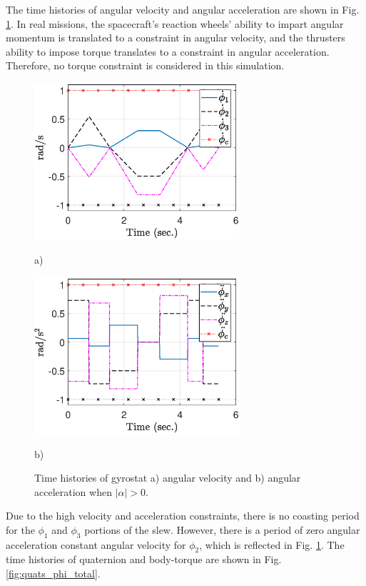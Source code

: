 \documentclass[letterpaper, paper,12pt]{AAS}		%
\begin{document}
The time histories of angular velocity and angular acceleration are shown in Fig. \ref{fig:ang_vel_acc}. In real missions, the spacecraft's reaction wheels' ability to impart angular momentum is translated to a constraint in angular velocity, and the thrusters ability to impose torque translates to a constraint in angular acceleration. Therefore, no torque constraint is considered in this simulation.
\begin{figure}[!ht]
    \centering
    \begin{minipage}{.5\textwidth}
        \centering
    \includegraphics[width=3in]{figures/alphaNot0/ang_vel_phi_total.eps}
    \caption{a)}
    \end{minipage}%
    \begin{minipage}{0.5\textwidth}
        \centering
        \includegraphics[width=3in]{figures/alphaNot0/ang_accel_total.eps}
       \caption{b)}
    \end{minipage}

    \caption{Time histories of gyrostat a) angular velocity and b) angular acceleration when $|\alpha|>0$.}
    \label{fig:ang_vel_acc} 
\end{figure}
Due to the high velocity and acceleration constraints, there is no coasting period for the $\phi_1$ and $\phi_3$ portions of the slew. However, there is a period of zero angular acceleration constant angular velocity for $\phi_2$, which is reflected in Fig. \ref{fig:ang_vel_acc}. The time histories of quaternion and body-torque are shown in Fig. \ref{fig:quats_phi_total}.
\end{document}
